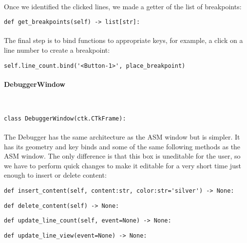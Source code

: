 \documentclass{article}
\newcommand{\subsubsubsection}[1]{\paragraph{#1}\mbox{}\\}
\begin{document}
\paragraph{}

Once we identified the clicked lines, we made a getter of the list of breakpoints: \\

\begin{lstlisting}[language=MyPython]
def get_breakpoints(self) -> list[str]:
\end{lstlisting}
\paragraph{}

The final step is to bind functions to appropriate keys, for example, a click on a line number to create a breakpoint: \\

\begin{lstlisting}[language=MyPython]
self.line_count.bind('<Button-1>', place_breakpoint)
\end{lstlisting}


\newpage
\subsubsubsection{DebuggerWindow}
\begin{lstlisting}[language=MyPython]
class DebuggerWindow(ctk.CTkFrame):
\end{lstlisting}
\paragraph{}

The Debugger has the same architecture as the ASM window but is simpler. It has its geometry and key binds and some of the same following methods as the ASM window. The only difference is that this box is uneditable for the user, so we have to perform quick changes to make it editable for a very short time just enough to insert or delete content: \\

\begin{lstlisting}[language=MyPython]
def insert_content(self, content:str, color:str='silver') -> None:
\end{lstlisting}
\begin{lstlisting}[language=MyPython]
def delete_content(self) -> None:
\end{lstlisting}
\begin{lstlisting}[language=MyPython]
def update_line_count(self, event=None) -> None:
\end{lstlisting}
\begin{lstlisting}[language=MyPython]
def update_line_view(event=None) -> None:
\end{lstlisting}
\end{document}
